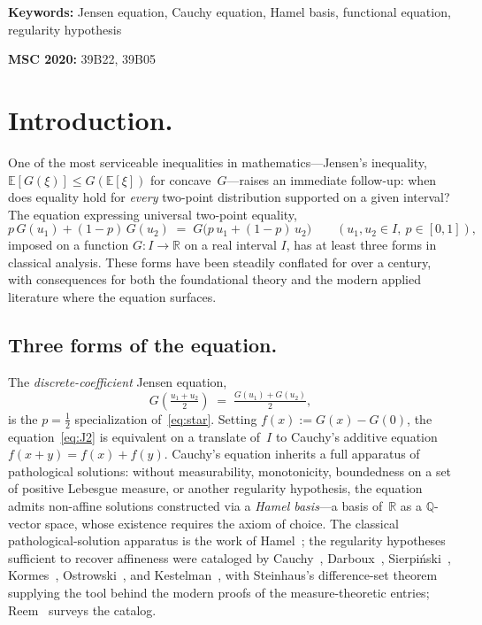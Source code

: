 \documentclass{article}
\theoremstyle{plain}
\theoremstyle{definition}
\newcommand{\R}{\mathbb{R}}
\newcommand{\Q}{\mathbb{Q}}
\newcommand{\E}{\mathbb{E}}
\begin{document}
\vspace{8px}

\noindent\textbf{Keywords:} Jensen equation, Cauchy equation, Hamel basis,
functional equation, regularity hypothesis

\vspace{4px}

\noindent\textbf{MSC 2020:} 39B22, 39B05

\vspace{8px}

\section{Introduction.}
\label{sec:intro}

One of the most serviceable inequalities in mathematics---Jensen's
inequality, $\E[G(\xi)]\le G(\E[\xi])$ for concave~$G$---raises an
immediate follow-up: when does equality hold for \emph{every} two-point
distribution supported on a given interval? The equation expressing
universal two-point equality,
\begin{equation}
p\,G(u_1)+(1-p)\,G(u_2) \;=\; G\bigl(p\,u_1+(1-p)\,u_2\bigr)
\qquad (u_1,u_2\in I,\ p\in[0,1]),
\tag{$\star$}\label{eq:star}
\end{equation}
imposed on a function $G\colon I\to\R$ on a real interval $I$, has
at least three forms in classical analysis. These forms have been steadily
conflated for over a century, with consequences for both the foundational
theory and the modern applied literature where the equation surfaces.

\subsection{Three forms of the equation.}

The \emph{discrete-coefficient} Jensen equation,
\begin{equation}
G\!\left(\tfrac{u_1+u_2}{2}\right) \;=\; \tfrac{G(u_1)+G(u_2)}{2},
\tag{$J_2$}\label{eq:J2}
\end{equation}
is the $p=\tfrac{1}{2}$ specialization of~\eqref{eq:star}. Setting
$f(x):=G(x)-G(0)$, the equation~\eqref{eq:J2} is equivalent on a
translate of~$I$ to Cauchy's additive equation $f(x+y)=f(x)+f(y)$.
Cauchy's equation inherits a full apparatus of pathological solutions:
without measurability, monotonicity, boundedness on a set of positive
Lebesgue measure, or another regularity hypothesis, the equation admits
non-affine solutions constructed via a \emph{Hamel basis}---a basis
of~$\R$ as a $\Q$-vector space, whose existence requires the axiom of
choice. The classical pathological-solution apparatus is the work of
Hamel~\cite{Hamel1905}; the regularity hypotheses sufficient to recover
affineness were cataloged by Cauchy~\cite{Cauchy1821},
Darboux~\cite{Darboux1875,Darboux1880}, Sierpi\'nski~\cite{Sierpinski1920},
Kormes~\cite{Kormes1926}, Ostrowski~\cite{Ostrowski1929}, and
Kestelman~\cite{Kestelman1947}, with Steinhaus's difference-set
theorem~\cite{Steinhaus1920} supplying the tool behind the modern
proofs of the measure-theoretic entries; Reem~\cite{Reem2017} surveys
the catalog.
\end{document}

